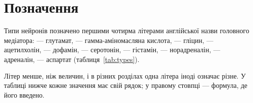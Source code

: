 \chapter{Позначення}
\label{sec:notation}

Типи нейронів позначено першими чотирма літерами англійської назви головного медіатора:  --- глутамат,  --- гамма-аміномасляна кислота,  --- гліцин,  --- ацетилхолін,  --- дофамін,  --- серотонін,  --- гістамін,  --- норадреналін,  --- адреналін,  --- аспартат (таблиця~\ref{tab:types}).

Літер менше, ніж величин, і в різних розділах одна літера іноді означає різне. У таблиці нижче кожне значення має свій рядок; у правому стовпці --- формула, де його введено.

